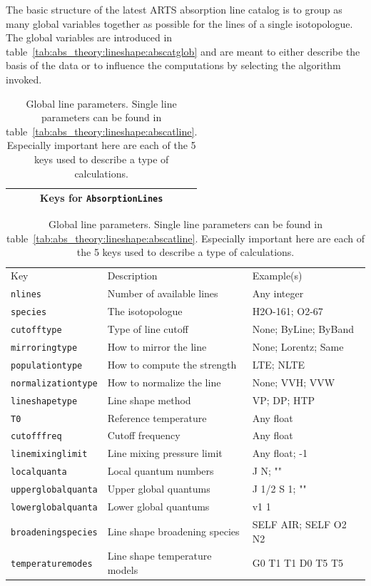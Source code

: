 The basic structure of the latest ARTS absorption line catalog
is to group as many global variables together as possible for 
the lines of a single isotopologue.  The global variables are
introduced in table~\ref{tab:abs_theory:lineshape:abscatglob}
and are meant to either describe the basis of the data or to
influence the computations by selecting the algorithm invoked.

\begin{table}[ht!]
 \centering
 \begin{tabular}{c}
  Keys for \verb|AbsorptionLines|\\\hline
 \end{tabular}
 \begin{tabular}{lll}
  Key&Description&Example(s)\\
  \verb|nlines|&Number of available lines&Any integer\\
  \verb|species|&The isotopologue&H2O-161; O2-67\\
  \verb|cutofftype|&Type of line cutoff&None; ByLine; ByBand\\
  \verb|mirroringtype|&How to mirror the line&None; Lorentz; Same\\
  \verb|populationtype|&How to compute the strength&LTE; NLTE\\
  \verb|normalizationtype|&How to normalize the line&None; VVH; VVW\\
  \verb|lineshapetype|&Line shape method&VP; DP; HTP\\
  \verb|T0|&Reference temperature&Any float\\
  \verb|cutofffreq|&Cutoff frequency&Any float\\
  \verb|linemixinglimit|&Line mixing pressure limit&Any float; -1\\
  \verb|localquanta|&Local quantum numbers&J N; ""\\
  \verb|upperglobalquanta|&Upper global quantums&J 1/2 S 1; ""\\
  \verb|lowerglobalquanta|&Lower global quantums&v1 1\\
  \verb|broadeningspecies|&Line shape broadening species&SELF AIR; SELF O2 N2\\
  \verb|temperaturemodes|&Line shape temperature models&G0 T1 T1 D0 T5 T5\\
 \end{tabular}
\caption{Global line parameters.  Single line parameters can be found in table~\ref{tab:abs_theory:lineshape:abscatline}.
Especially important here are
each of the 5 keys used to describe a type of calculations.
}
\end{table}
